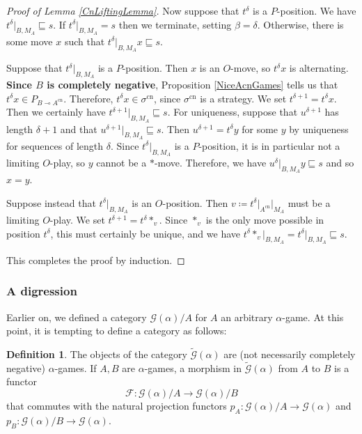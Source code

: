 \documentclass[11pt]{article} %
\theoremstyle{plain} %
\theoremstyle{definition} %
\newtheorem{definition}[theorem]{Definition}
\theoremstyle{note}
\theoremstyle{exercisestyle}
\newcommand*\from{\colon}
\renewcommand{\implies}{\multimap}
\newcommand{\G}{\mathcal G}
\newcommand{\F}{\mathcal F}
\newcommand{\prefix}{\sqsubseteq}
\DeclareMathOperator{\cn}{cn}
\begin{document}
\begin{proof}[Proof of Lemma \ref{CnLiftingLemma}]
  Now suppose that $t^\delta$ is a $P$-position.  We have $t^\delta\vert_{B,M_A}\prefix s$.  If $t^\delta\vert_{B,M_A}=s$ then we terminate, setting $\beta=\delta$.  Otherwise, there is some move $x$ such that $t^\delta\vert_{B,M_A}x\prefix s$.  

  Suppose that $t^\delta\vert_{B,M_A}$ is a $P$-position.  Then $x$ is an $O$-move, so $t^\delta x$ is alternating.  \textbf{Since $B$ is completely negative}, Proposition \ref{NiceAcnGames} tells us that $t^\delta x\in P_{B\implies A^{\cn}}$.  Therefore, $t^\delta x\in\sigma^{\cn}$, since $\sigma^{\cn}$ is a strategy.  We set $t^{\delta+1}=t^\delta x$.  Then we certainly have $t^{\delta+1}\vert_{B,M_A}\prefix s$.  For uniqueness, suppose that $u^{\delta+1}$ has length $\delta+1$ and that $u^{\delta+1}\vert_{B,M_A}\prefix s$.  Then $u^{\delta+1}=t^\delta y$ for some $y$ by uniqueness for sequences of length $\delta$.  Since $t^\delta\vert_{B,M_A}$ is a $P$-position, it is in particular not a limiting $O$-play, so $y$ cannot be a $*$-move.  Therefore, we have $u^{\delta}\vert_{B,M_A}y\prefix s$ and so $x=y$.  

  Suppose instead that $t^\delta\vert_{B,M_A}$ is an $O$-position.  Then $v\coloneqq t^\delta\vert_{A^{\cn}}\vert_{M_A}$ must be a limiting $O$-play.  We set $t^{\delta+1}=t^\delta *_v$.  Since $*_v$ is the only move possible in position $t^\delta$, this must certainly be unique, and we have $t^\delta *_v\vert_{B,M_A}=t^\delta\vert_{B,M_A}\prefix s$.  

  This completes the proof by induction.
\end{proof}

\subsubsection{A digression}

Earlier on, we defined a category $\G(\alpha)/A$ for $A$ an arbitrary $\alpha$-game.  At this point, it is tempting to define a category as follows:

\begin{definition}
  The objects of the category $\tilde{\G}(\alpha)$ are (not necessarily completely negative) $\alpha$-games.  If $A,B$ are $\alpha$-games, a morphism in $\tilde{\G}(\alpha)$ from $A$ to $B$ is a functor
  \[
    \F\from\G(\alpha)/A\to\G(\alpha)/B
    \]
  that commutes with the natural projection functors $p_A\from\G(\alpha)/A\to\G(\alpha)$ and $p_B\from\G(\alpha)/B\to\G(\alpha)$.  
\end{definition}
\end{document}
